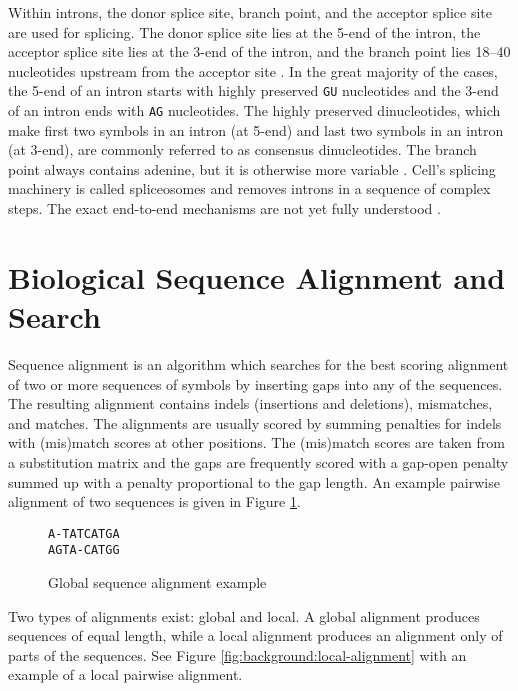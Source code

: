 Within introns, the donor splice site, branch point, and the acceptor splice
site are used for splicing. The donor splice site lies at the
5\textquotesingle{}-end of the intron, the acceptor splice site lies at the
3\textquotesingle{}-end of the intron, and the branch point lies 18--40
nucleotides upstream from the acceptor site \cite{clancy2008rna}. In the great
majority of the cases, the 5\textquotesingle{}-end of an intron starts with
highly preserved \Verb_GU_ nucleotides and the 3\textquotesingle{}-end of an
intron ends with \Verb_AG_ nucleotides. The highly preserved dinucleotides,
which make first two symbols in an intron (at 5\textquotesingle{}-end) and last
two symbols in an intron (at 3\textquotesingle{}-end), are commonly referred to
as consensus dinucleotides. The branch point always contains adenine, but it is
otherwise more variable \cite{clancy2008rna}. Cell's splicing machinery is
called spliceosomes and removes introns in a sequence of complex steps. The
exact end-to-end mechanisms are not yet fully understood \cite{clancy2008rna}.

\section{\label{ch:background:alignment}Biological Sequence Alignment and Search}

Sequence alignment is an algorithm which searches for the best scoring
alignment of two or more sequences of symbols by inserting gaps into any of the
sequences. The resulting alignment contains indels (insertions and deletions),
mismatches, and matches. The alignments are usually scored by summing penalties
for indels with (mis)match scores at other positions. The (mis)match scores are
taken from a substitution matrix and the gaps are frequently scored with a
gap-open penalty summed up with a penalty proportional to the gap length. An
example pairwise alignment of two sequences is given in Figure
\ref{fig:background:global-alignment}.

\begin{figure}
\centering
\begin{BVerbatim}[baselinestretch=0.75]
A-TATCATGA
AGTA-CATGG
\end{BVerbatim}
\caption{Global sequence alignment example}
\label{fig:background:global-alignment}
\end{figure}

Two types of alignments exist: global and local. A global alignment produces
sequences of equal length, while a local alignment produces an alignment only
of parts of the sequences. See Figure \ref{fig:background:local-alignment} with
an example of a local pairwise alignment.

